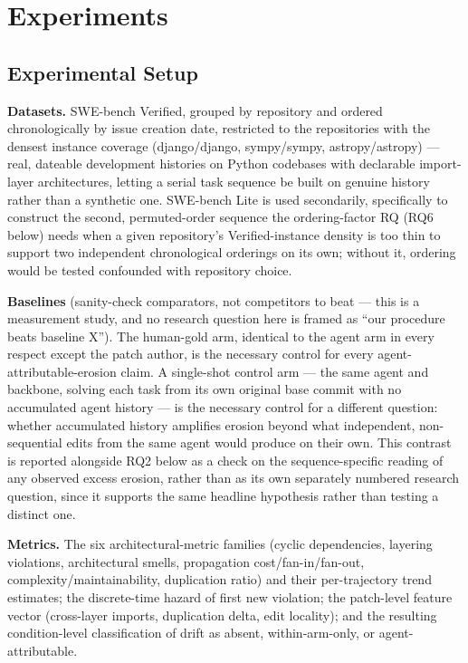 \documentclass[11pt]{article}
\begin{document}
\section{Experiments}

\subsection{Experimental Setup}

\textbf{Datasets.} SWE-bench Verified, grouped by repository and ordered chronologically by issue creation date, restricted to the repositories with the densest instance coverage (django/django, sympy/sympy, astropy/astropy) --- real, dateable development histories on Python codebases with declarable import-layer architectures, letting a serial task sequence be built on genuine history rather than a synthetic one. SWE-bench Lite is used secondarily, specifically to construct the second, permuted-order sequence the ordering-factor RQ (RQ6 below) needs when a given repository's Verified-instance density is too thin to support two independent chronological orderings on its own; without it, ordering would be tested confounded with repository choice.

\textbf{Baselines} (sanity-check comparators, not competitors to beat --- this is a measurement study, and no research question here is framed as ``our procedure beats baseline X''). The human-gold arm, identical to the agent arm in every respect except the patch author, is the necessary control for every agent-attributable-erosion claim. A single-shot control arm --- the same agent and backbone, solving each task from its own original base commit with no accumulated agent history --- is the necessary control for a different question: whether accumulated history amplifies erosion beyond what independent, non-sequential edits from the same agent would produce on their own. This contrast is reported alongside RQ2 below as a check on the sequence-specific reading of any observed excess erosion, rather than as its own separately numbered research question, since it supports the same headline hypothesis rather than testing a distinct one.

\textbf{Metrics.} The six architectural-metric families (cyclic dependencies, layering violations, architectural smells, propagation cost/fan-in/fan-out, complexity/maintainability, duplication ratio) and their per-trajectory trend estimates; the discrete-time hazard of first new violation; the patch-level feature vector (cross-layer imports, duplication delta, edit locality); and the resulting condition-level classification of drift as absent, within-arm-only, or agent-attributable.
\end{document}
